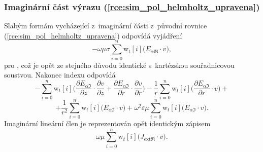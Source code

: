 \subsubsection*{Imaginární část výrazu (\ref{rce:sim_pol_helmholtz_upravena})}
Slabým formám vycházející z~imaginární části z~původní rovnice (\ref{rce:sim_pol_helmholtz_upravena}) odpovídá vyjádření
\begin{equation}
 -\omega\mu\sigma\sum_{i=0}^{n}\mathrm{w}_{t}[i]\bigg(E_{\alpha\Re}\cdot v\bigg),
	\label{rce:sim_pol_bilinear_imag_real} 
\end{equation}
pro , což je opět ze stejného důvodu identické s~kartézskou souřadnicovou soustvou. Nakonec indexu  odpovídá
\begin{displaymath}
-\sum_{i=0}^{n}\mathrm{w}_{t}[i]\bigg(\frac{\partial E_{\alpha\Im}}{\partial z}\cdot \frac{\partial v}{\partial z} + \frac{\partial E_{\alpha\Im}}{\partial r}\cdot \frac{\partial v}{\partial r} \bigg) - \frac{1}{r}\sum_{i=0}^{n}\mathrm{w}_{t}[i]\bigg(\frac{\partial E_{\alpha\Im}}{\partial r}\cdot v\bigg) +
\end{displaymath}
\begin{equation}
	 + \frac{1}{r^{2}}\sum_{i=0}^{n}\mathrm{w}_{t}[i]\bigg(E_{\alpha\Im}\cdot v\bigg) + \omega^{2}\varepsilon\mu\sum_{i=0}^{n}\mathrm{w}_{t}[i]\bigg(E_{\alpha\Im}\cdot v\bigg).
	\label{rce:sim_pol_bilinear_imag_imag} 
\end{equation}
Imaginární lineární člen je reprezentován opět identickým zápisem
\begin{equation}
 \omega\mu\sum_{i=0}^{n}\mathrm{w}_{t}[i]\bigg(J_{\mathrm{ext}\Re}\cdot v\bigg).
	\label{rce:sim_pol_linear_imag_num} 
\end{equation}